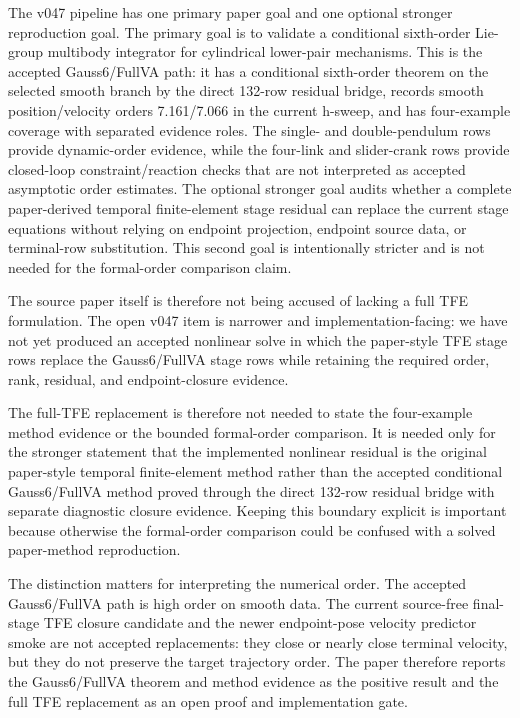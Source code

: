 \documentclass[11pt]{article}
\newcommand{\method}{Gauss6/FullVA}
\newcommand{\tfe}{TFE}
\begin{document}
The v047 pipeline has one primary paper goal and one optional stronger
reproduction goal.  The primary goal is to validate a conditional sixth-order
Lie-group multibody integrator for cylindrical lower-pair mechanisms.  This is the
accepted \method{} path: it has a conditional sixth-order theorem on the
selected smooth branch by the direct 132-row residual bridge, records smooth
position/velocity orders 7.161/7.066 in the current h-sweep, and has
four-example coverage with separated evidence roles.  The single- and
double-pendulum rows provide dynamic-order evidence, while the four-link and
slider-crank rows provide closed-loop constraint/reaction checks that are not
interpreted as accepted asymptotic order estimates.  The
optional stronger goal audits whether a
complete paper-derived temporal finite-element stage residual can replace the
current stage equations without relying on endpoint projection, endpoint
source data, or terminal-row substitution.  This second goal is intentionally
stricter and is not needed for the formal-order comparison claim.

The source paper itself is therefore not being accused of lacking a full
\tfe{} formulation.  The open v047 item is narrower and implementation-facing:
we have not yet produced an accepted nonlinear solve in which the paper-style
\tfe{} stage rows replace the Gauss6/FullVA stage rows while retaining the
required order, rank, residual, and endpoint-closure evidence.

The full-\tfe{} replacement is therefore not needed to state the four-example
method evidence or the bounded formal-order comparison.  It is needed only for the
stronger statement that the implemented nonlinear residual is the original
paper-style temporal finite-element method rather than the accepted
conditional Gauss6/FullVA method proved through the direct 132-row residual
bridge with separate diagnostic closure evidence.
Keeping this boundary explicit is important because otherwise the formal-order
comparison could be confused with a solved paper-method reproduction.

The distinction matters for interpreting the numerical order.  The accepted
\method{} path is high order on smooth data.  The current source-free
final-stage \tfe{} closure candidate and the newer endpoint-pose velocity
predictor smoke are not accepted replacements: they close or nearly close
terminal velocity, but they do not preserve the target trajectory order.  The
paper therefore reports the \method{} theorem and method evidence as the
positive result and the full \tfe{} replacement as an open proof and
implementation gate.
\end{document}
